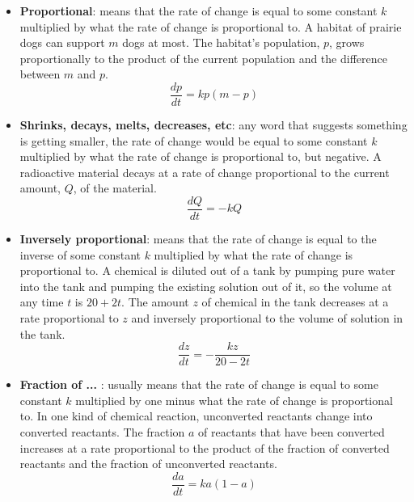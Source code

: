 \documentclass[12pt]{article}
\begin{document}
            \begin{itemize}
                \item \textbf{Proportional}: means that the rate of change is equal to some constant $k$ multiplied by what the rate of change is proportional to.
                \newline \newline
                A habitat of prairie dogs can support $m$ dogs at most. The habitat's population, $p$, grows proportionally to the product of the current population and the difference between $m$ and $p$.
                \[ \frac{dp}{dt} = kp(m-p) \]

                \item \textbf{Shrinks, decays, melts, decreases, etc}: any word that suggests something is getting smaller, the rate of change would be equal to some constant $k$ multiplied by what the rate of change is proportional to, but negative.
                \newline \newline
                A radioactive material decays at a rate of change proportional to the current amount, $Q$, of the material.
                \[ \frac{dQ}{dt} = -kQ \]

                \item \textbf{Inversely proportional}: means that the rate of change is equal to the inverse of some constant $k$ multiplied by what the rate of change is proportional to.
                \newline \newline
                A chemical is diluted out of a tank by pumping pure water into the tank and pumping the existing solution out of it, so the volume at any time $t$ is $20+2t$. The amount $z$ of chemical in the tank decreases at a rate proportional to $z$ and inversely proportional to the volume of solution in the tank.
                \[ \frac{dz}{dt} = -\frac{kz}{20-2t} \]

                \item \textbf{Fraction of ... }: usually means that the rate of change is equal to some constant $k$ multiplied by one minus what the rate of change is proportional to.
                \newline \newline
                In one kind of chemical reaction, unconverted reactants change into converted reactants. The fraction $a$ of reactants that have been converted increases at a rate proportional to the product of the fraction of converted reactants and the fraction of unconverted reactants.
                \[ \frac{da}{dt} = ka(1-a) \]
            \end{itemize}
\end{document}
